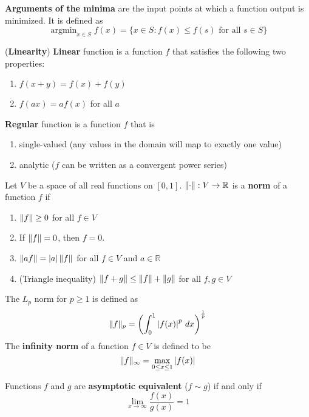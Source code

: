 \documentclass{huhtakm-template-book}
\DeclareMathOperator*{\argmin}{argmin}
\begin{document}
\begin{defn}
	\textbf{Arguments of the minima} are the input points at which a function output is minimized. It is defined as
	\begin{equation*}
		\argmin_{x\in S}f(x)=\{x\in S:f(x)\leq f(s)\text{ for all }s\in S\}
	\end{equation*}
\end{defn}
\begin{defn}(\textbf{Linearity})
	\textbf{Linear} function is a function $f$ that satisfies the following two properties:
	\begin{enumerate}
		\item $f(x+y)=f(x)+f(y)$
		\item $f(ax)=af(x)$ for all $a$
	\end{enumerate}
\end{defn}
\begin{defn}
	\textbf{Regular} function is a function $f$ that is
	\begin{enumerate}
		\item single-valued (any values in the domain will map to exactly one value)
		\item analytic ($f$ can be written as a convergent power series)
	\end{enumerate}
\end{defn}
\begin{defn}
	Let $V$ be a space of all real functions on $[0,1]$. $\lVert{\cdot}\rVert:V\to\mathbb{R}$ is a \textbf{norm} of a function $f$ if
	\begin{enumerate}
		\item $\lVert{f}\rVert\geq 0$ for all $f\in V$
		\item If $\lVert{f}\rVert=0$, then $f=0$.
		\item $\lVert{af}\rVert=\left|{a}\right|\lVert{f}\rVert$ for all $f\in V$ and $a\in\mathbb{R}$
		\item (Triangle inequality) $\lVert{f+g}\rVert\leq\lVert{f}\rVert+\lVert{g}\rVert$ for all $f,g\in V$
	\end{enumerate}
	The $L_{p}$ norm for $p\geq 1$ is defined as
	\begin{equation*}
		\lVert{f}\rVert_{p}=\left(\int_{0}^{1}\left|{f(x)}\right|^{p}\,dx\right)^{\frac{1}{p}}
	\end{equation*}
	The \textbf{infinity norm} of a function $f\in V$ is defined to be
	\begin{equation*}
		\lVert{f}\rVert_{\infty}=\max_{0\leq x\leq 1}\left|{f(x)}\right|
	\end{equation*}
\end{defn}
\begin{defn}
	Functions $f$ and $g$ are \textbf{asymptotic equivalent} ($f\sim g$) if and only if
	\begin{equation*}
		\lim_{x\to\infty}\frac{f(x)}{g(x)}=1
	\end{equation*}
\end{defn}
\end{document}
